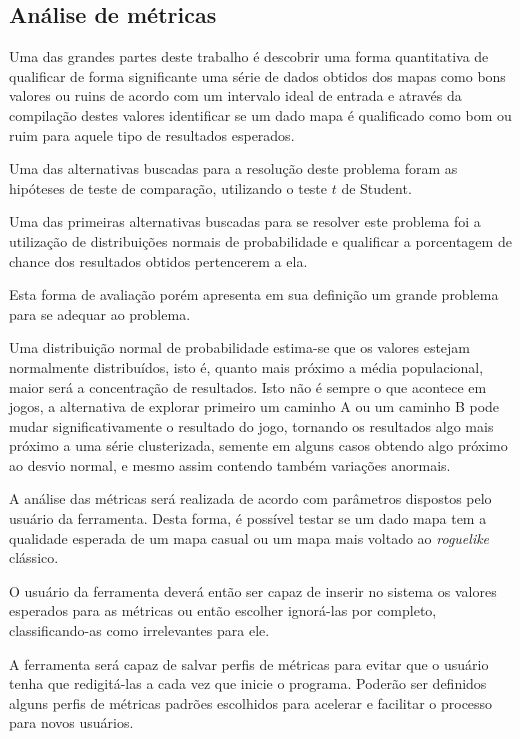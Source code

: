 \subsection{Análise de métricas}

Uma das grandes partes deste trabalho é descobrir uma forma quantitativa de qualificar de forma significante uma série de dados obtidos dos mapas como bons valores ou ruins de acordo com um intervalo ideal de entrada e através da compilação destes valores identificar se um dado mapa é qualificado como bom ou ruim para aquele tipo de resultados esperados.

Uma das alternativas buscadas para a resolução deste problema foram as hipóteses de teste de comparação, utilizando o teste $t$ de Student.

Uma das primeiras alternativas buscadas para se resolver este problema foi a utilização de distribuições normais de probabilidade e qualificar a porcentagem de chance dos resultados obtidos pertencerem a ela. 

Esta forma de avaliação porém apresenta em sua definição um grande problema para se adequar ao problema. 

Uma distribuição normal de probabilidade estima-se que os valores estejam normalmente distribuídos, isto é, quanto mais próximo a média populacional, maior será a concentração de resultados. Isto não é sempre o que acontece em jogos, a alternativa de explorar primeiro um caminho A ou um caminho B pode mudar significativamente o resultado do jogo, tornando os resultados algo mais próximo a uma série clusterizada, semente em alguns casos obtendo algo próximo ao desvio normal, e mesmo assim contendo também variações anormais.



A análise das métricas será realizada de acordo com parâmetros dispostos pelo usuário da ferramenta. Desta forma, é possível testar se um dado mapa tem a qualidade esperada de um mapa casual ou um mapa mais voltado ao \textit{roguelike} clássico. 

O usuário da ferramenta deverá então ser capaz de inserir no sistema os valores esperados para as métricas ou então escolher ignorá-las por completo, classificando-as como irrelevantes para ele.

A ferramenta será capaz de salvar perfis de métricas para evitar que o usuário tenha que redigitá-las a cada vez que inicie o programa. Poderão ser definidos alguns perfis de métricas padrões escolhidos para acelerar e facilitar o processo para novos usuários.

